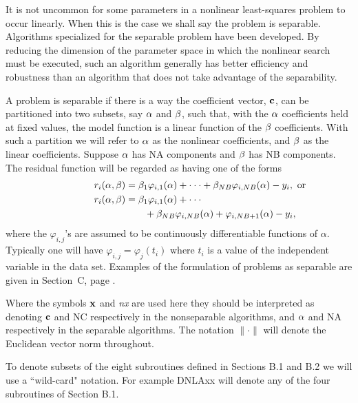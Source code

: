 \documentclass[twoside]{MATH77}
\begin{document}
It is not uncommon for some parameters in a nonlinear least-squares problem
to occur linearly. When this is the case we shall say the problem is
separable. Algorithms specialized for the separable problem have been
developed. By reducing the dimension of the parameter space in which the
nonlinear search must be executed, such an algorithm generally has better
efficiency and robustness than an algorithm that does not take advantage of
the separability.

A problem is separable if there is a way the coefficient vector, ${\bf c}$,
can be partitioned into two subsets, say ${\bf \alpha }$ and ${\bf \beta }$,
such that, with the ${\bf \alpha }$ coefficients held at fixed values, the
model function is a linear function of the ${\bf \beta }$ coefficients. With
such a partition we will refer to ${\bf \alpha }$ as the nonlinear
coefficients, and ${\bf \beta }$ as the linear coefficients. Suppose ${\bf %
\alpha }$ has NA components and ${\bf \beta }$ has NB components. The
residual function will be regarded as having one of the forms
\begin{align}
\hspace{-15pt}\label{O3}r_i({\bf \alpha },{\bf \beta })&=\beta _1
\varphi _{i,1}({\bf \alpha })+\cdot \cdot \cdot +\beta _{NB}
\varphi _{i,NB}({\bf \alpha })-y_i,\ \text{or ~~~}\hspace{-1in}\\
\hspace{-15pt}r_i({\bf \alpha },{\bf \beta })&=\beta _1\varphi _{i,1}({\bf \alpha })
+\cdot \cdot \cdot \notag\\
\label{O4}& \qquad +\beta _{NB}\varphi _{i,NB}({\bf \alpha })+
\varphi_{i,NB+1}({\bf \alpha })-y_i,\hspace{-2in}
\end{align}
where the $\varphi _{i,j}$'s are assumed to be continuously
differentiable functions of {\bf $\alpha $}. Typically one will have $\varphi
_{i,j}=\varphi _j(t_i)$ where $t_i$ is a value of the independent variable in
the data set. Examples of the formulation of problems as separable are given
in Section~C, page \pageref{refsep}.

Where the symbols ${\bf x}$ and {\em nx} are used here they should be
interpreted as denoting ${\bf c}$ and NC respectively in the nonseparable
algorithms, and ${\bf \alpha }$ and NA respectively in the separable
algorithms.  The notation $\| \cdot \| $ will denote the Euclidean vector
norm throughout.

To denote subsets of the eight subroutines defined in Sections B.1 and B.2
we will use a ``wild-card" notation. For example DNLAxx will denote any of
the four subroutines of Section B.1.
\end{document}

